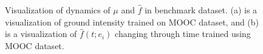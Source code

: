 \begin{figure}[hb]

    \centering
    \hfill
    \caption{Visualization of dynamics of $\mu$ and $\hat{f}$ in benchmark dataset. (a) is a visualization of ground intensity trained on MOOC dataset, and (b) is a visualization of $\hat{f}(t;e_i)$ changing through time trained using MOOC dataset.}
\end{figure}


